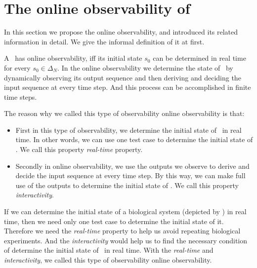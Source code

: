 \section{The online observability of \BCNs}
\label{sec:online}
In this section we propose the online observability, and introduced its related information in detail. We give the informal definition of it at first. 

	A \BCN\ has online observability, iff its initial state $s_0$ can be determined in real time for every $s_0 \in \Delta_N$. In the online observability we determine the state of \BCN\ by dynamically observing its output sequence and then deriving and deciding the input sequence at every time step. And this process can be accomplished in finite time steps.

The reason why we called this type of observability online observability is that:
\begin{itemize}
  \item First in this type of observability, we determine the initial state of \BCNs\ in real time. In other words, we can use one test case to determine the initial state of \BCNs. We call this property {\em real-time} property.%
  \item  Secondly in online observability, we use the outputs we observe to derive and decide the input sequence at every time step. By this way, we can make full use of the outputs to determine the initial state of \BCNs. We call this property {\em interactivity}.
\end{itemize} 

If we can determine the initial state of a biological system (depicted by \BCN) in real time, then we need only one test case to determine the initial state of it. Therefore we need the {\em real-time} property to help us avoid repeating biological experiments. And the {\em interactivity} would help us to find the necessary condition of determine the initial state of \BCNs\ in real time. With the  {\em real-time} and {\em interactivity}, we called this type of observability online observability.

